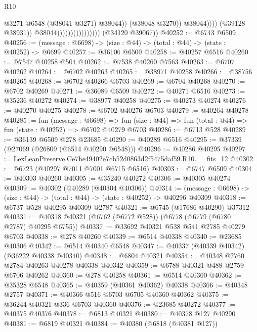 \begin{lexlean}{R10}
\begin{coremodule}
                                                      @3271
                                                      @6548
                                                      (@38041 @3271)
                                                      @38044))
                                                  (@38048 @3270))
                                                @38044))))
                                        (@39128 @38931))
                                      @38044))))))))))))))))
      (@34120 @39067))
@40252 := @6743 @6509
@40256 := (message : @6698) -> (size : @44) -> (total : @44) -> (state : @40252) -> @6699
@40257 := @36106 @6509
@40258 := @40257 @6516
@40260 := @7547 @40258 @504
@40262 := @7538 @40260 @7563
@40263 := @6707 @40262
@40264 := @6702 @40263
@40265 := @38971 @40258
@40266 := @38756 @40265
@40268 := @6702 @40266 @6703
@40269 := @6704 @40268
@40270 := @6702 @40269
@40271 := @36089 @6509
@40272 := @40271 @6516
@40273 := @35236 @40272
@40274 := @38977 @40258
@40275 := @40273 @40274
@40276 := @40270 @40275
@40278 := @6702 @40276 @6703
@40279 := @40264 @40278
@40285 := fun (message : @6698) =>
  fun (size : @44) => fun (total : @44) => fun (state : @40252) => @6702 @40279 @6703
@40286 := @6713 @528
@40289 := @36139 @6509 @278 @23685
@40290 := @40289 @6516
@40295 := @37339 (@27069 (@26809 (@6514 @40290 @6548)))
@40296 := @40286 @40295
@40297 := LexLeanPreserve.Ce7be49402e7cb52d0863d2f5475daf59.R10.__fits_12
@40302 := @6723 (@40297 @7011 @7001 @6715 @6516)
@40303 := @6747 @6509
@40304 := @40303 @40260
@40305 := @35240 @40272
@40306 := @40305 @40274
@40309 := @40302 (@40289 (@40304 @40306))
@40314 := (message : @6698) -> (size : @44) -> (total : @44) -> (state : @40252) -> @40296 @40309
@40318 := @6737 @528 @40295 @40309 @2787
@40321 := @6745 (@17686 @40290) @37312
@40331 := @40318 @40321 (@6762 (@6772 @528)) (@6778 (@6779 (@6780 @2787) @40295 @6755))
@40337 := @33692 @40321 @538 @541 @2785 @40279 @6703
@40338 := @278 @40260
@40339 := @6514 @40338
@40340 := @23685 @40306
@40342 := @6514 @40340 @6548
@40347 := @40337 (@40339 @40342) (@36222 @40338 @40340)
@40348 := @6804 @40321
@40354 := @40348 @2760 @2784 @40263 @40278 @40338 @40342
@40359 := @6788 @40321 @488 @2759 @6706 @40262
@40360 := @278 @40258
@40361 := @6514 @40360
@40362 := @35328 @6548
@40365 := @40359 (@40361 @40362) @40338
@40366 := @40348 @2757
@40371 := @40366 @516 @6703 @6705 @40360 @40362
@40375 := @36244 @40321 @336 @6703 @40360
@40376 := @23685 @40272
@40377 := @40375 @40376
@40378 := @6813 @40321
@40380 := @40378 @127 @40290
@40381 := @6819 @40321
@40384 := @40380 (@6818 (@40381 @127))

\end{coremodule}
\end{lexlean}
